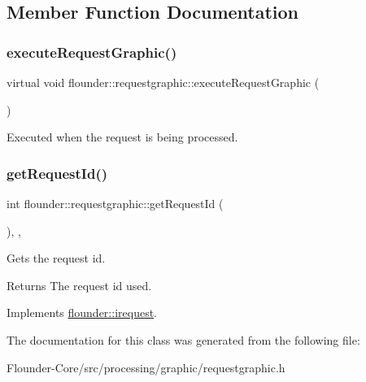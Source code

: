 \subsection{Member Function Documentation}
\mbox{\label{classflounder_1_1requestgraphic_aa4bff2170113f2c96b0b7acf20c81cd7}} 
\subsubsection{\texorpdfstring{execute\+Request\+Graphic()}{executeRequestGraphic()}}
{\footnotesize\ttfamily virtual void flounder\+::requestgraphic\+::execute\+Request\+Graphic (\begin{DoxyParamCaption}{ }\end{DoxyParamCaption})\hspace{0.3cm}{\ttfamily [pure virtual]}}



Executed when the request is being processed. 

\mbox{\label{classflounder_1_1requestgraphic_adc8967c8b3db4d7e932cdeee346a31ff}} 
\subsubsection{\texorpdfstring{get\+Request\+Id()}{getRequestId()}}
{\footnotesize\ttfamily int flounder\+::requestgraphic\+::get\+Request\+Id (\begin{DoxyParamCaption}{ }\end{DoxyParamCaption})\hspace{0.3cm}{\ttfamily [inline]}, {\ttfamily [override]}, {\ttfamily [virtual]}}



Gets the request id. 

\begin{DoxyReturn}{Returns}
The request id used. 
\end{DoxyReturn}


Implements \hyperlink{classflounder_1_1irequest_a69e6b820c6635486e488e6aa18b11730}{flounder\+::irequest}.



The documentation for this class was generated from the following file\+:\begin{DoxyCompactItemize}
\item 
Flounder-\/\+Core/src/processing/graphic/requestgraphic.\+h\end{DoxyCompactItemize}
